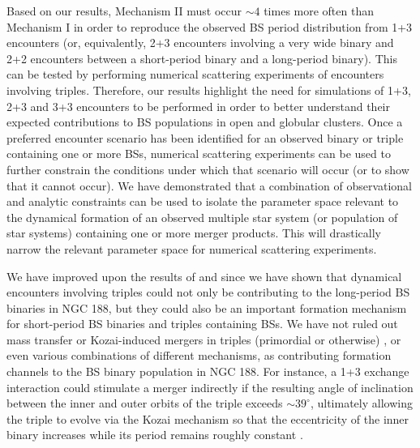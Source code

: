 Based on our results, Mechanism II must occur $\sim 4$ times more
often than Mechanism I in order to reproduce the observed BS period
distribution from 1+3 encounters (or, equivalently, 2+3 encounters
involving a very wide binary and 2+2 encounters between a 
short-period binary and a long-period binary).  This can be tested by performing
numerical scattering experiments of encounters involving triples.
Therefore, our
results highlight the need for simulations of
1+3, 2+3 and 3+3 encounters to be performed in order to better
understand their expected contributions to BS populations in open and
globular clusters.  Once a preferred encounter scenario has been
identified for an observed binary or triple containing one or more
BSs, numerical scattering experiments can be used to
further constrain the conditions under which that scenario will occur
(or to show 
that it cannot occur).  We have demonstrated that a combination of 
observational and analytic constraints can be used to isolate the
parameter space relevant to the dynamical formation of an observed
multiple star system (or population of star systems) containing
one or more merger products.  This will drastically narrow the
relevant parameter space for numerical scattering experiments.

We have improved upon the results of \citet{perets09} and
\citet{mathieu09} since we have shown that dynamical encounters
involving triples could not only be contributing to
the long-period BS binaries in NGC 188, but they could also be an
important formation
mechanism for short-period BS binaries and triples containing BSs.  We
have not ruled out mass transfer or Kozai-induced 
mergers in triples (primordial or otherwise) \citep{mathieu09,
  perets09}, or even various 
combinations of different mechanisms, as contributing formation channels
to the BS binary population in NGC 188.  For instance, a 1+3 exchange
interaction could stimulate a merger indirectly if the resulting angle
of inclination between the inner and 
outer orbits of the triple exceeds $\sim 39^{\circ}$, ultimately
allowing
the triple to evolve via the Kozai mechanism so that the eccentricity
of the inner binary increases while its period remains roughly
constant \citep{eggleton06}.  

